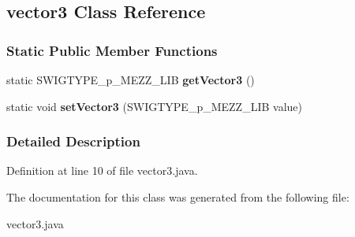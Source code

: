 \hypertarget{classvector3}{
\subsection{vector3 Class Reference}
\label{classvector3}
}
\subsubsection*{Static Public Member Functions}
\begin{DoxyCompactItemize}
\item 
\hypertarget{classvector3_a78ffa128df1dfbc1e383da662c01e129}{
static SWIGTYPE\_\-p\_\-MEZZ\_\-LIB {\bfseries getVector3} ()}
\label{classvector3_a78ffa128df1dfbc1e383da662c01e129}

\item 
\hypertarget{classvector3_aab696994dc09aa9799049f4f095dfb8d}{
static void {\bfseries setVector3} (SWIGTYPE\_\-p\_\-MEZZ\_\-LIB value)}
\label{classvector3_aab696994dc09aa9799049f4f095dfb8d}

\end{DoxyCompactItemize}


\subsubsection{Detailed Description}


Definition at line 10 of file vector3.java.



The documentation for this class was generated from the following file:\begin{DoxyCompactItemize}
\item 
vector3.java\end{DoxyCompactItemize}
